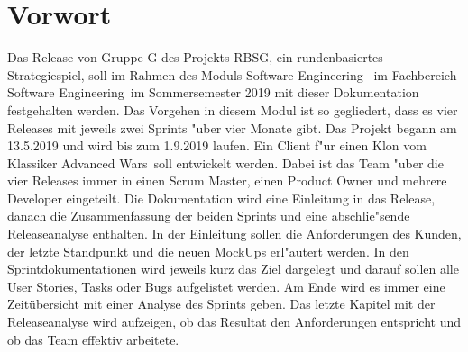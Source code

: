 \documentclass[12pt, titlepage]{scrartcl}
\newcommand{\RN}[1]{%
	\textup{\uppercase\expandafter{\romannumeral#1}}%
}
\begin{document}
	\section{Vorwort}
    	Das Release \RN{3} von Gruppe G des Projekts RBSG, ein rundenbasiertes Strategiespiel, soll im Rahmen des Moduls \glqq Software Engineering \RN{1}\grqq\ im Fachbereich \glqq Software Engineering\grqq\ im Sommersemester 2019 mit dieser Dokumentation festgehalten werden.
    	\vspace{0.3cm} \newline
        Das Vorgehen in diesem Modul ist so gegliedert, dass es vier Releases mit jeweils zwei Sprints "uber vier Monate gibt. Das Projekt begann am 13.5.2019 und wird bis zum 1.9.2019 laufen. Ein Client f"ur einen Klon vom Klassiker \glqq Advanced Wars\grqq\ soll entwickelt werden. Dabei ist das Team "uber die vier Releases immer in einen Scrum Master, einen Product Owner und mehrere Developer eingeteilt.
        \vspace{0.3cm} \newline
        Die Dokumentation wird eine Einleitung in das Release, danach die Zusammenfassung der beiden Sprints und eine abschlie"sende Releaseanalyse enthalten. In der Einleitung sollen die Anforderungen des Kunden, der letzte Standpunkt und die neuen MockUps erl"autert werden. In den Sprintdokumentationen wird jeweils kurz das Ziel dargelegt und darauf sollen alle User Stories, Tasks oder Bugs aufgelistet werden. Am Ende wird es immer eine Zeit\"ubersicht mit einer Analyse des Sprints geben. Das letzte Kapitel mit der Releaseanalyse wird aufzeigen, ob das Resultat den Anforderungen entspricht und ob das Team effektiv arbeitete.
    \newpage
    \tableofcontents
    \newpage
\end{document}
